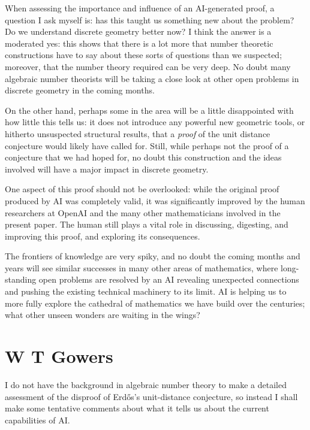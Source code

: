 \documentclass[11pt,reqno]{amsart}
\numberwithin{equation}{section}
\theoremstyle{definition}
\theoremstyle{remark}
\begin{document}
When assessing the importance and influence of an AI-generated proof, a question I ask myself is: has this taught us something new about the problem? Do we understand discrete geometry better now? I think the answer is a moderated yes: this shows that there is a lot more that number theoretic constructions have to say about these sorts of questions than we suspected; moreover, that the number theory required can be very deep. No doubt many algebraic number theorists will be taking a close look at other open problems in discrete geometry in the coming months.

On the other hand, perhaps some in the area will be a little disappointed with how little this tells us: it does not introduce any powerful new geometric tools, or hitherto unsuspected structural results, that a \emph{proof} of the unit distance conjecture would likely have called for. Still, while perhaps not the proof of a conjecture that we had hoped for, no doubt this construction and the ideas involved will have a major impact in discrete geometry.

One aspect of this proof should not be overlooked: while the original proof produced by AI was completely valid, it was significantly improved by the human researchers at OpenAI and the many other mathematicians involved in the present paper. The human still plays a vital role in discussing, digesting, and improving this proof, and exploring its consequences.

The frontiers of knowledge are very spiky, and no doubt the coming months and years will see similar successes in many other areas of mathematics, where long-standing open problems are resolved by an AI revealing unexpected connections and pushing the existing technical machinery to its limit. AI is helping us to more fully explore the cathedral of mathematics we have build over the centuries; what other unseen wonders are waiting in the wings?
\section{W T Gowers}

I do not have the background in algebraic number theory to make a detailed assessment of the disproof of Erd\H os's unit-distance conjecture, so instead I shall make some tentative comments about what it tells us about the current capabilities of AI. 
\end{document}

